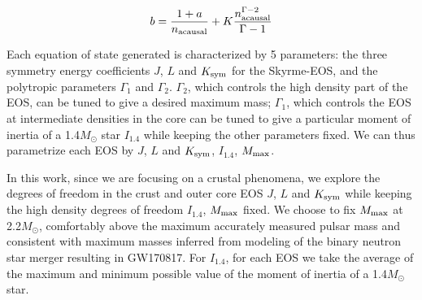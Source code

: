 \documentclass[fleqn,usenatbib]{mnras}
\begin{document}
\begin{equation}
b = \frac{1+a}{n_{\rm acausal}} + K \frac{n_{\rm acausal}^{\Gamma-2}}{\Gamma-1}
\end{equation}

Each equation of state generated is characterized by 5 parameters: the three symmetry energy coefficients $J$, $L$ and $K_{\rm sym}$ for the Skyrme-EOS, and the polytropic parameters $\Gamma_1$ and $\Gamma_2$. $\Gamma_2$, which controls the high density part of the EOS, can be tuned to give a desired maximum mass; $\Gamma_1$, which controls the EOS at intermediate densities in the core can be tuned to give a particular moment of inertia of a 1.4$M_{\odot}$ star $I_{1.4}$ while keeping the other parameters fixed. We can thus parametrize each EOS by $J$, $L$ and $K_{\rm sym}$, $I_{1.4}$, $M_{\rm max}$.

In this work, since we are focusing on a crustal phenomena, we explore the degrees of freedom in the crust and outer core EOS $J$, $L$ and $K_{\rm sym}$ while keeping the high density degrees of freedom $I_{1.4}$, $M_{\rm max}$ fixed. We choose to fix $M_{\rm max}$ at 2.2$M_{\odot}$, comfortably above the maximum accurately measured pulsar mass and consistent with maximum masses inferred from modeling of the binary neutron star merger resulting in GW170817. For $I_{1.4}$, for each EOS we take the average of the maximum and minimum possible value of the moment of inertia of a 1.4$M_{\odot}$ star.














\end{document}
